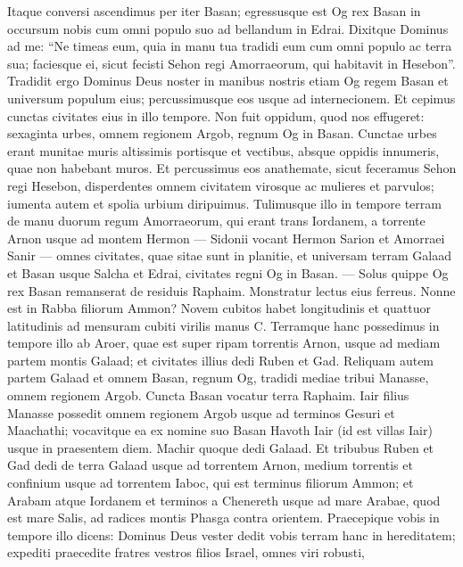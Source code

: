 \begin{biblechapter}
\begin{biblechapter}
\begin{biblechapter}
\verse Itaque conversi ascendimus per iter Basan; egressusque est Og rex Basan in occursum nobis cum omni populo suo ad bellandum in Edrai. 
\verse Dixitque Dominus ad me: “Ne timeas eum, quia in manu tua tradidi eum cum omni populo ac terra sua; faciesque ei, sicut fecisti Sehon regi Amorraeorum, qui habitavit in Hesebon”. 
\verse Tradidit ergo Dominus Deus noster in manibus nostris etiam Og regem Basan et universum populum eius; percussimusque eos usque ad internecionem. 
\verse Et cepimus cunctas civitates eius in illo tempore. Non fuit oppidum, quod nos effugeret: sexaginta urbes, omnem regionem Argob, regnum Og in Basan. 
\verse Cunctae urbes erant munitae muris altissimis portisque et vectibus, absque oppidis innumeris, quae non habebant muros. 
\verse Et percussimus eos anathemate, sicut feceramus Sehon regi Hesebon, disperdentes omnem civitatem virosque ac mulieres et parvulos; 
\verse iumenta autem et spolia urbium diripuimus.
 \verse Tulimusque illo in tempore terram de manu duorum regum Amorraeorum, qui erant trans Iordanem, a torrente Arnon usque ad montem Hermon 
\verse — Sidonii vocant Hermon Sarion et Amorraei Sanir — 
\verse omnes civitates, quae sitae sunt in planitie, et universam terram Galaad et Basan usque Salcha et Edrai, civitates regni Og in Basan. 
\verse — Solus quippe Og rex Basan remanserat de residuis Raphaim. Monstratur lectus eius ferreus. Nonne est in Rabba filiorum Ammon? Novem cubitos habet longitudinis et quattuor latitudinis ad mensuram cubiti virilis manus C.
 \verse Terramque hanc possedimus in tempore illo ab Aroer, quae est super ripam torrentis Arnon, usque ad mediam partem montis Galaad; et civitates illius dedi Ruben et Gad. 
\verse Reliquam autem partem Galaad et omnem Basan, regnum Og, tradidi mediae tribui Manasse, omnem regionem Argob. Cuncta Basan vocatur terra Raphaim. 
\verse Iair filius Manasse possedit omnem regionem Argob usque ad terminos Gesuri et Maachathi; vocavitque ea ex nomine suo Basan Havoth Iair (id est villas Iair) usque in praesentem diem. 
\verse Machir quoque dedi Galaad. 
\verse Et tribubus Ruben et Gad dedi de terra Galaad usque ad torrentem Arnon, medium torrentis et confinium usque ad torrentem Iaboc, qui est terminus filiorum Ammon; 
\verse et Arabam atque Iordanem et terminos a Chenereth usque ad mare Arabae, quod est mare Salis, ad radices montis Phasga contra orientem.
 \verse Praecepique vobis in tempore illo dicens: Dominus Deus vester dedit vobis terram hanc in hereditatem; expediti praecedite fratres vestros filios Israel, omnes viri robusti, 

\end{biblechapter}
\end{biblechapter}
\end{biblechapter}

